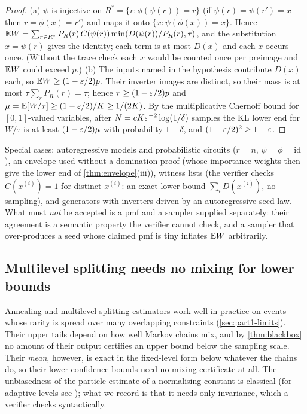 \begin{proof}
(a) $\psi$ is injective on $R^*=\{r:\phi(\psi(r))=r\}$ (if
$\psi(r)=\psi(r')=x$ then $r=\phi(x)=r'$) and maps it onto
$\{x:\psi(\phi(x))=x\}$. Hence $\mathbb{E}
W=\sum_{r\in R^*}P_R(r)\,C(\psi(r))\min(D(\psi(r))/P_R(r),\tau)$, and the
substitution $x=\psi(r)$ gives the identity; each term is at most $D(x)$ and
each $x$ occurs once. (Without the trace check each $x$ would be counted once
per preimage and $\mathbb{E} W$ could exceed $p$.) (b) The inputs named in the
hypothesis contribute $D(x)$ each, so $\mathbb{E} W\ge(1-\varepsilon/2)p$. Their inverter
images are distinct, so their mass is at most $\tau\sum_rP_R(r)=\tau$; hence
$\tau\ge(1-\varepsilon/2)p$ and $\mu=\mathbb{E}[W/\tau]\ge(1-\varepsilon/2)/K\ge1/(2K)$. By the
multiplicative Chernoff bound for $[0,1]$-valued variables, after
$N=cK\varepsilon^{-2}\log(1/\delta)$ samples the KL lower end for $W/\tau$ is at least
$(1-\varepsilon/2)\mu$ with probability $1-\delta$, and $(1-\varepsilon/2)^2\ge1-\varepsilon$.
\end{proof}

Special cases: autoregressive models and probabilistic circuits ($r=n$,
$\psi=\phi=\mathrm{id}$), an envelope used without a domination proof (whose
importance weights then give the lower end of \cref{thm:envelope}(iii)),
witness lists (the verifier checks $C(x^{(i)})=1$ for distinct $x^{(i)}$: an
exact lower bound $\sum_iD(x^{(i)})$, no sampling), and generators with
inverters driven by an autoregressive seed law. What must \emph{not} be
accepted is a pmf and a sampler supplied separately: their agreement is a
semantic property the verifier cannot check, and a sampler that over-produces
a seed whose claimed pmf is tiny inflates $\mathbb{E} W$ arbitrarily.

\subsection{Multilevel splitting needs no mixing for lower bounds}\label{sec:splitting}

Annealing and multilevel-splitting estimators work well in practice on events whose
rarity is spread over many overlapping constraints (\cref{sec:part1-limits}). Their
upper tails depend on how well Markov chains mix, and by \cref{thm:blackbox} no
amount of their output certifies an upper bound below the sampling scale. Their
\emph{mean}, however, is exact in the fixed-level form below whatever the chains do,
so their lower confidence bounds need no mixing certificate at all. The unbiasedness
of the particle estimate of a normalising constant is classical
\cite{delmoral2004,cerou2012} (for adaptive levels see \cite{brehier2016}); what we
record is that it needs only invariance, which a verifier checks syntactically.


